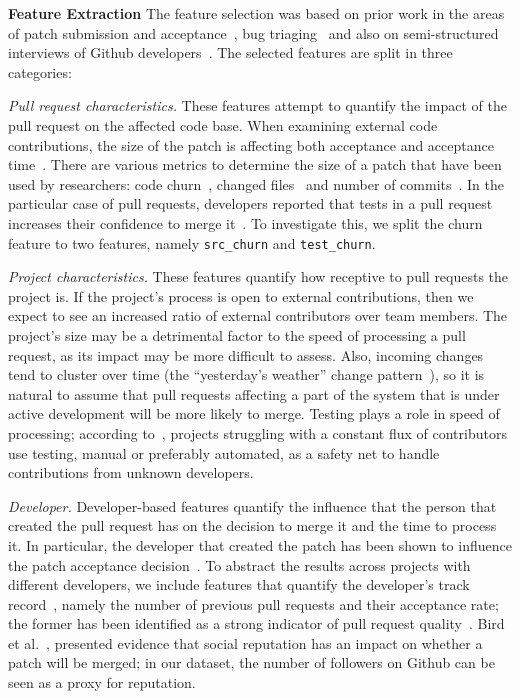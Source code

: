 \documentclass{sig-alternate}
\begin{document}
\textbf{Feature Extraction} The feature selection was based on prior work in the areas of patch submission
and acceptance~\cite{Nagap05,Bird07a,Weiss08,Baysa12}, bug
triaging~\cite{Anvik06, Giger10} and also on semi-structured interviews of
Github developers~\cite{Dabbi12, Pham13}. The selected features are split
in three categories:

  \emph{Pull request characteristics.} These
    features attempt to quantify the impact of the
    pull request on the affected code base. When examining external code
    contributions, the size of the patch is affecting both acceptance and
    acceptance time~\cite{Weiss08}. There are various metrics to determine the
    size of a patch that have been used by researchers: code
    churn~\cite{Nagap05, Ratzi07}, changed files~\cite{Nagap05} and number of
    commits~\cite{Fluri07}. In the particular case of pull requests, developers
    reported that tests in a pull request increases their confidence to merge
    it~\cite{Pham13}. To investigate this, we split the churn feature to two
    features, namely \texttt{src\_churn} and \texttt{test\_churn}. 

  \emph{Project characteristics.} These features quantify how receptive to pull
  requests the project is. If the project's process is open to external
  contributions, then we expect to see an increased ratio of external
  contributors over team members. The project's size may be a detrimental factor
  to the speed of processing a pull request, as its impact may be more difficult
  to assess. Also, incoming changes tend to cluster over time (the ``yesterday's
  weather'' change pattern~\cite{Girba04}), so it is natural to assume that pull
  requests affecting a part of the system that is under active development will
  be more likely to merge. Testing plays a role in speed of processing;
  according to~\cite{Pham13}, projects struggling with a constant flux of
  contributors use testing, manual or preferably automated, as a safety net to
  handle contributions from unknown developers.

  \emph{Developer.}  Developer-based features quantify the influence that the
  person that created the pull request has on the decision to merge it and the
  time to process it. In particular, the developer that created the patch has
  been shown to influence the patch acceptance decision~\cite{Jeong09}. To
  abstract the results across projects with different developers, we include
  features that quantify the developer's track record~\cite{Dabbi12}, namely the
  number of previous pull requests and their acceptance rate; the former has
  been identified as a strong indicator of pull request quality~\cite{Pham13}.
  Bird et al.~\cite{Bird07}, presented evidence that social reputation has an
  impact on whether a patch will be merged; in our dataset, the number of
  followers on Github can be seen as a proxy for reputation.
\end{document}

